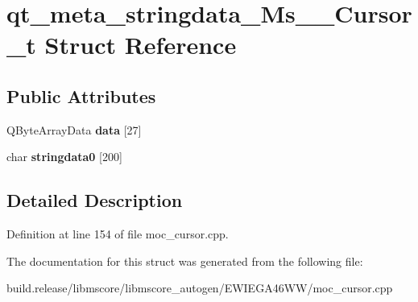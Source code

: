 \hypertarget{structqt__meta__stringdata___ms_____cursor__t}{}\section{qt\+\_\+meta\+\_\+stringdata\+\_\+\+Ms\+\_\+\+\_\+\+Cursor\+\_\+t Struct Reference}
\label{structqt__meta__stringdata___ms_____cursor__t}
\subsection*{Public Attributes}
\begin{DoxyCompactItemize}
\item 
\mbox{\label{structqt__meta__stringdata___ms_____cursor__t_a2d4ae39746b4be9d4ea9bfb560c15570}} 
Q\+Byte\+Array\+Data {\bfseries data} \mbox{[}27\mbox{]}
\item 
\mbox{\label{structqt__meta__stringdata___ms_____cursor__t_ae02389a7f316aceed503e7688e236111}} 
char {\bfseries stringdata0} \mbox{[}200\mbox{]}
\end{DoxyCompactItemize}


\subsection{Detailed Description}


Definition at line 154 of file moc\+\_\+cursor.\+cpp.



The documentation for this struct was generated from the following file\+:\begin{DoxyCompactItemize}
\item 
build.\+release/libmscore/libmscore\+\_\+autogen/\+E\+W\+I\+E\+G\+A46\+W\+W/moc\+\_\+cursor.\+cpp\end{DoxyCompactItemize}
